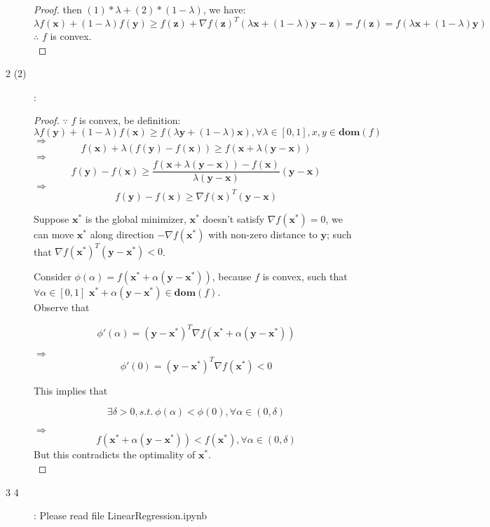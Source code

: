 \documentclass[UTF8]{ctexart}
\begin{document}
\begin{description}
\begin{proof}
then $(1)*\lambda+(2)*(1-\lambda)$, we have:
$$\lambda f(\bm{x}) + (1-\lambda)f(\bm{y}) \geq f(\bm{z}) + \nabla f(\bm{z})^T(\lambda \bm{x}+(1-\lambda)\bm{y} - \bm{z})=f(\bm{z})=f(\lambda \bm{x}+(1-\lambda)\bm{y})$$
$\therefore$ $f$ is convex.\\
\end{proof}
\item[2 (2)]:
\begin{proof}
$\because$ $f$ is convex, be definition:
$$\lambda f(\bm{y}) + (1-\lambda)f(\bm{x}) \geq f(\lambda \bm{y}+(1-\lambda)\bm{x}), \forall \lambda \in [0,1], x,y\in\bm{dom}(f)$$
$\Rightarrow$
$$f(\bm{x}) + \lambda(f(\bm{y})-f(\bm{x})) \geq f(\bm{x}+\lambda(\bm{y}-\bm{x}))$$
$\Rightarrow$
$$f(\bm{y})-f(\bm{x}) \geq \frac{f(\bm{x}+\lambda(\bm{y}-\bm{x})) - f(\bm{x})}{\lambda(\bm{y}-\bm{x})}(\bm{y} - \bm{x})$$
$\Rightarrow$
$$f(\bm{y})-f(\bm{x}) \geq \nabla f(\bm{x})^T(\bm{y}-\bm{x})$$

Suppose $\bm{x^*}$ is the global minimizer, $\bm{x^*}$ doesn't satisfy $\nabla f(\bm{x^*}) = 0$, we can move $\bm{x^*}$ along direction $-\nabla f(\bm{x^*})$ with non-zero distance to $\bm{y}$; such that $\nabla f(\bm{x^*})^T(\bm{y}-\bm{x^*}) < 0$.
\par Consider $\phi(\alpha) = f(\bm{x^*}+\alpha(\bm{y}-\bm{x^*}))$, because $f$ is convex, such that $\forall \alpha \in [0,1]$ $\bm{x^*} + \alpha(\bm{y}-\bm{x^*}) \in \bm{dom}(f)$.\\
Observe that

$$\phi\prime(\alpha) = (\bm{y}-\bm{x^*})^T \nabla f(\bm{x^*}+\alpha(\bm{y}-\bm{x^*}))$$

$\Rightarrow$ $$\phi\prime(0) = (\bm{y}-\bm{x^*})^T\nabla f(\bm{x^*}) < 0$$


This implies that

$$\exists \delta > 0, s.t.\ \phi(\alpha) < \phi(0), \forall \alpha \in (0, \delta)$$

$\Rightarrow$ $$f(\bm{x^*} + \alpha(\bm{y}-\bm{x^*})) < f(\bm{x^*}), \forall \alpha \in (0, \delta)$$
But this contradicts the optimality of $\bm{x^*}$.\\

\end{proof}

\item[3 4]: Please read file LinearRegression.ipynb\\
\end{description}
\end{document}
